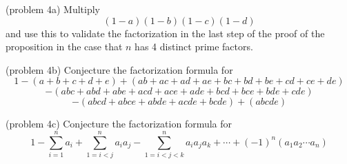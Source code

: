 \documentclass[handout]{ximera}
\begin{document}
 \begin{problem}(problem 4a)
 Multiply
\[
(1-a)(1-b)(1-c)(1-d)
\]
and use this to validate the factorization in the last step of the proof of the proposition in the case that $n$ has 4 distinct prime factors.
\end{problem}

\begin{problem}(problem 4b)
Conjecture the factorization formula for
\[
1 - (a + b+c+d+e) + (ab+ac+ad+ae+bc+bd+be+cd+ce+de) 
\]
\[
- (abc+abd+abe+acd+ace+ade+bcd+bce+bde+cde) 
\]
\[
- (abcd+abce+abde+acde+bcde) + (abcde)
\]
\end{problem}

\begin{problem}(problem 4c)
Conjecture the factorization formula for
\[
1 - \sum_{i = 1}^n a_i + \sum_{1 = i <j}^n a_ia_j - \sum_{1 = i <j<k}^n a_ia_ja_k + \cdots + (-1)^n (a_1a_2\cdots a_n)
\]
\end{problem}
\end{document}
